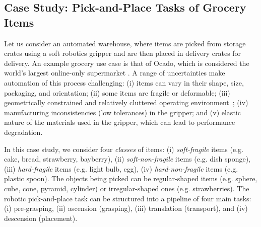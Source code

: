 \documentclass[letterpaper, 10 pt, conference]{ieeeconf}  %
\begin{document}
	
	\subsection{Case Study: Pick-and-Place Tasks of Grocery Items}
	Let us consider an automated warehouse, where items are picked from storage crates using a soft robotics gripper and are then placed in delivery crates for delivery. 
	An example grocery use case is that of Ocado, which is considered the world's largest online-only supermarket \cite{Triantafyllou2019, Sotiropoulos2018}. 
	A range of uncertainties make automation of this process challenging: (i) items can vary in their shape, size, packaging, and orientation; (ii) some items are fragile or deformable; (iii) geometrically constrained and relatively cluttered operating environment~\cite{Triantafyllou2019}; (iv) manufacturing inconsistencies (low tolerances) in the gripper; and (v) elastic nature of the materials used in the gripper, which can lead to performance degradation.
	
	In this case study, we consider four \emph{classes} of items: (i) \emph{soft-fragile} items (e.g. cake, bread, strawberry, bayberry), (ii) \emph{soft-non-fragile} items (e.g. dish sponge), (iii) \emph{hard-fragile} items (e.g. light bulb, egg), (iv) \emph{hard-non-fragile} items (e.g. plastic spoon). 
	The objects being picked can be regular-shaped items (e.g. sphere, cube, cone, pyramid, cylinder) or irregular-shaped ones (e.g. strawberries). The robotic pick-and-place task can be structured into a pipeline of four main tasks: (i) pre-grasping, (ii) ascension (grasping), (iii) translation (transport), and (iv) descension (placement). 
\end{document}
